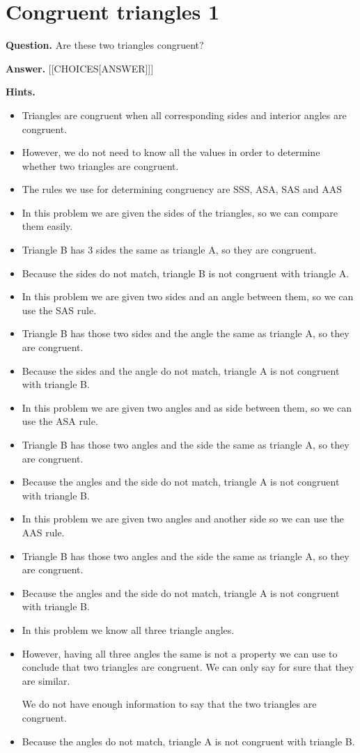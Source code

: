 \documentclass{article}
\begin{document}
\section*{Congruent triangles 1}
\textbf{Question.} Are these two triangles congruent?

\textbf{Answer.} [[CHOICES[ANSWER]]]

\textbf{Hints.}
\begin{itemize}
  \item Triangles are congruent when all corresponding sides and interior angles are congruent.
  \item However, we do not need to know all the values in order to determine whether two triangles are congruent.
  \item The rules we use for determining congruency are SSS, ASA, SAS and AAS
  \item In this problem we are given the sides of the triangles, so we can compare them easily.
  \item Triangle B has 3 sides the same as triangle A, so they are congruent.
  \item Because the sides do not match, triangle B is not congruent with triangle A.
  \item In this problem we are given two sides and an angle between them, so we can use the SAS rule.
  \item Triangle B has those two sides and the angle the same as triangle A, so they are congruent.
  \item Because the sides and the angle do not match, triangle A is not congruent with triangle B.
  \item In this problem we are given two angles and as side between them, so we can use the ASA rule.
  \item Triangle B has those two angles and the side the same as triangle A, so they are congruent.
  \item Because the angles and the side do not match, triangle A is not congruent with triangle B.
  \item In this problem we are given two angles and another side so we can use the AAS rule.
  \item Triangle B has those two angles and the side the same as triangle A, so they are congruent.
  \item Because the angles and the side do not match, triangle A is not congruent with triangle B.
  \item In this problem we know all three triangle angles.
  \item However, having all three angles the same is not a property we can use to conclude that two triangles are congruent. We can only say for sure that they are similar.
                        
                        We do not have enough information to say that the two triangles are congruent.
  \item Because the angles do not match, triangle A is not congruent with triangle B.
\end{itemize}
\end{document}

